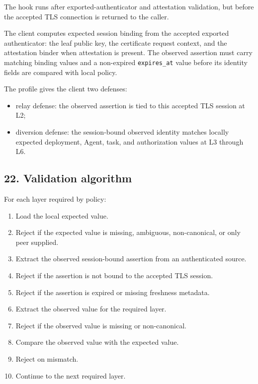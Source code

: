 \documentclass[
]{article}
\providecommand{\tightlist}{%
  \setlength{\itemsep}{0pt}\setlength{\parskip}{0pt}}
\begin{document}
The hook runs after exported-authenticator and attestation validation,
but before the accepted TLS connection is returned to the caller.

The client computes expected session binding from the accepted exported
authenticator: the leaf public key, the certificate request context, and
the attestation binder when attestation is present. The observed
assertion must carry matching binding values and a non-expired
\texttt{expires\_at} value before its identity fields are compared with
local policy.

The profile gives the client two defenses:

\begin{itemize}
\tightlist
\item
  relay defense: the observed assertion is tied to this accepted TLS
  session at L2;
\item
  diversion defense: the session-bound observed identity matches locally
  expected deployment, Agent, task, and authorization values at L3
  through L6.
\end{itemize}

\subsection{22. Validation algorithm}\label{validation-algorithm}

For each layer required by policy:

\begin{enumerate}
\def\labelenumi{\arabic{enumi}.}
\tightlist
\item
  Load the local expected value.
\item
  Reject if the expected value is missing, ambiguous, non-canonical, or
  only peer supplied.
\item
  Extract the observed session-bound assertion from an authenticated
  source.
\item
  Reject if the assertion is not bound to the accepted TLS session.
\item
  Reject if the assertion is expired or missing freshness metadata.
\item
  Extract the observed value for the required layer.
\item
  Reject if the observed value is missing or non-canonical.
\item
  Compare the observed value with the expected value.
\item
  Reject on mismatch.
\item
  Continue to the next required layer.
\end{enumerate}
\end{document}
